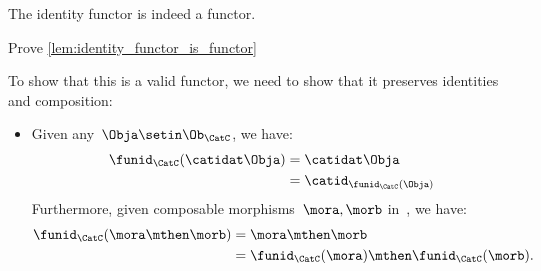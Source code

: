 \begin{lemma}
    \label{lem:identity_functor_is_functor}
    The identity functor is indeed a functor.
\end{lemma}

\begin{exercise}
    Prove \cref{lem:identity_functor_is_functor}
\end{exercise}
\begin{solution}
    To show that this is a valid functor, we need to show that it preserves identities and composition:
    \begin{itemize}
        \item Given any~$\Obja \setin \Ob_\CatC$, we have:
              \begin{equation}
                  \begin{aligned}
                      \funid_{\CatC}(\catidat\Obja) & =\catidat\Obja \\
                                                    & =\catid_{\funid_{\CatC}(\Obja)}
                  \end{aligned}
              \end{equation}
              Furthermore, given composable morphisms~$\mora,\morb$ in~\CatC, we have:
              \begin{equation}
                  \begin{aligned}
                      \funid_{\CatC}(\mora\mthen\morb) & =\mora\mthen\morb \\
                                                       & =\funid_{\CatC}(\mora)\mthen \funid_{\CatC} (\morb).
                  \end{aligned}
              \end{equation}
    \end{itemize}
\end{solution}

